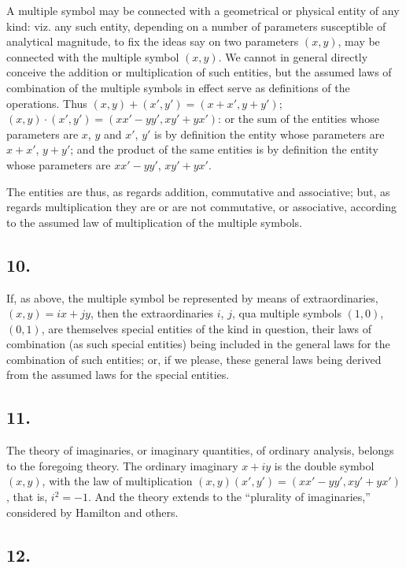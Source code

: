\documentclass[11pt,a4paper]{article}
\theoremstyle{definition}
\begin{document}
A multiple symbol may be connected with a geometrical or physical entity of any kind: viz. any such entity, depending on a number of parameters susceptible of analytical magnitude, to fix the ideas say on two parameters $(x, y)$, may be connected with the multiple symbol $(x, y)$. We cannot in general directly conceive the addition or multiplication of such entities, but the assumed laws of combination of the multiple symbols in effect serve as definitions of the operations. Thus $(x, y) + (x', y') = (x + x', y + y')$; $(x, y) \cdot (x', y') = (xx' - yy', xy' + yx')$: or the sum of the entities whose parameters are $x$, $y$ and $x'$, $y'$ is by definition the entity whose parameters are $x + x'$, $y + y'$; and the product of the same entities is by definition the entity whose parameters are $xx' - yy'$, $xy' + yx'$.

The entities are thus, as regards addition, commutative and associative; but, as regards multiplication they are or are not commutative, or associative, according to the assumed law of multiplication of the multiple symbols.

\subsection*{10.}

If, as above, the multiple symbol be represented by means of extraordinaries, $(x, y) = ix + jy$, then the extraordinaries $i$, $j$, qua multiple symbols $(1, 0)$, $(0, 1)$, are themselves special entities of the kind in question, their laws of combination (as such special entities) being included in the general laws for the combination of such entities; or, if we please, these general laws being derived from the assumed laws for the special entities.

\subsection*{11.}

The theory of imaginaries, or imaginary quantities, of ordinary analysis, belongs to the foregoing theory. The ordinary imaginary $x + iy$ is the double symbol $(x, y)$, with the law of multiplication $(x, y)(x', y') = (xx' - yy', xy' + yx')$, that is, $i^2 = -1$. And the theory extends to the ``plurality of imaginaries,'' considered by Hamilton and others.

\subsection*{12.}
\end{document}

